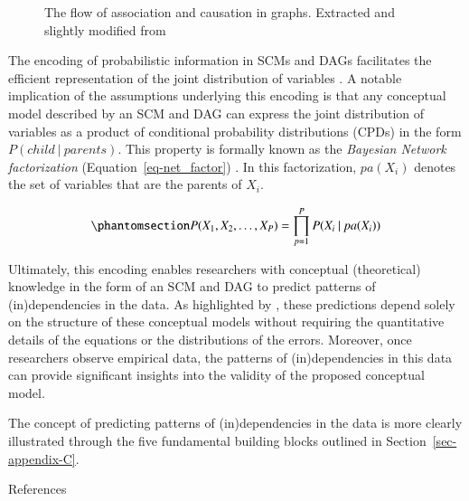 \documentclass[
  authoryear,
  review,
  1p]{elsarticle}
\begin{document}
\begin{figure}


\caption{\label{fig-ACflow}The flow of association and causation in
graphs. Extracted and slightly modified from \citet[pp.~31]{Neal_2020}}

\end{figure}%

The encoding of probabilistic information in SCMs and DAGs facilitates
the efficient representation of the joint distribution of variables
\citep[pp.~29]{Pearl_et_al_2016}. A notable implication of the
assumptions underlying this encoding is that any conceptual model
described by an SCM and DAG can express the joint distribution of
variables as a product of conditional probability distributions (CPDs)
in the form \(P(child \: | \: parents)\). This property is formally
known as the \emph{Bayesian Network factorization}
(Equation~\ref{eq-net_factor})
\citetext{\citealp[pp.~29]{Pearl_et_al_2016}; \citealp[pp.~21]{Neal_2020}}.
In this factorization, \(pa(X_{i})\) denotes the set of variables that
are the parents of \(X_{i}\).

\begin{equation}\phantomsection\label{eq-net_factor}{
P(X_{1}, X_{2}, \dots, X_{P}) = \prod^{P}_{p=1} P(X_{i} \: | \: pa(X_{i}) )
}\end{equation}

Ultimately, this encoding enables researchers with conceptual
(theoretical) knowledge in the form of an SCM and DAG to predict
patterns of (in)dependencies in the data. As highlighted by
\citet[pp.~35]{Pearl_et_al_2016}, these predictions depend solely on the
structure of these conceptual models without requiring the quantitative
details of the equations or the distributions of the errors. Moreover,
once researchers observe empirical data, the patterns of
(in)dependencies in this data can provide significant insights into the
validity of the proposed conceptual model.

The concept of predicting patterns of (in)dependencies in the data is
more clearly illustrated through the five fundamental building blocks
outlined in Section~\ref{sec-appendix-C}.

\newpage{}

References

\renewcommand{\bibsection}{}

\end{document}
